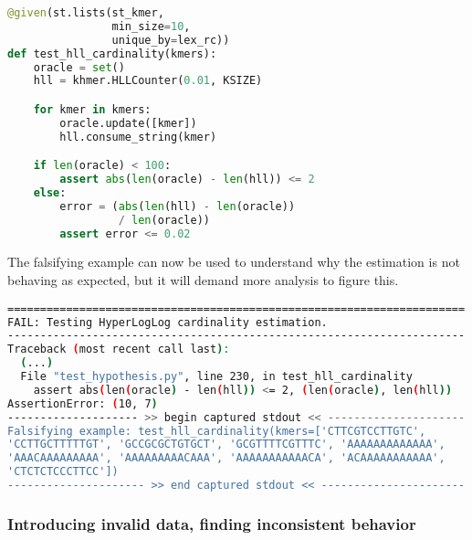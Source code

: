 \documentclass[preprint,nocopyrightspace]{sig-alternate}
\begin{document}
\begin{lstlisting}[language=Python,basicstyle=\small\tt,caption={HyperLogLog cardinality estimation test},label=hlltest]
@given(st.lists(st_kmer,
                min_size=10,
                unique_by=lex_rc))
def test_hll_cardinality(kmers):
    oracle = set()
    hll = khmer.HLLCounter(0.01, KSIZE)

    for kmer in kmers:
        oracle.update([kmer])
        hll.consume_string(kmer)

    if len(oracle) < 100:
        assert abs(len(oracle) - len(hll)) <= 2
    else:
        error = (abs(len(hll) - len(oracle))
                 / len(oracle))
        assert error <= 0.02
\end{lstlisting}


The falsifying example can now be used to understand why the estimation is not behaving as expected,
but it will demand more analysis to figure this.

\begin{lstlisting}[language=Bash,basicstyle=\tiny\tt,caption={HyperLogLog cardinality estimation test output, with falsifying example},label=hlltestoutput]
======================================================================
FAIL: Testing HyperLogLog cardinality estimation.
----------------------------------------------------------------------
Traceback (most recent call last):
  (...)
  File "test_hypothesis.py", line 230, in test_hll_cardinality
    assert abs(len(oracle) - len(hll)) <= 2, (len(oracle), len(hll))
AssertionError: (10, 7)
-------------------- >> begin captured stdout << ---------------------
Falsifying example: test_hll_cardinality(kmers=['CTTCGTCCTTGTC',
'CCTTGCTTTTTGT', 'GCCGCGCTGTGCT', 'GCGTTTTCGTTTC', 'AAAAAAAAAAAAA',
'AAACAAAAAAAAA', 'AAAAAAAAACAAA', 'AAAAAAAAAAACA', 'ACAAAAAAAAAAA',
'CTCTCTCCCTTCC'])
--------------------- >> end captured stdout << ----------------------
\end{lstlisting}

\subsubsection{Introducing invalid data, finding inconsistent behavior}
\end{document}
